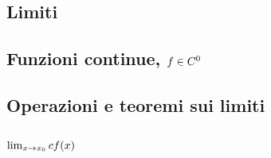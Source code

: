 \documentclass[letterpaper,10pt,italian]{jupyterBook}
\begin{document}
\subsection{Limiti}
\label{\detokenize{ch/infinitesimal_calculus/analysis-notes:limiti}}

\subsection{Funzioni continue, \protect\(f \in C^0\protect\)}
\label{\detokenize{ch/infinitesimal_calculus/analysis-notes:funzioni-continue-f-in-c-0}}

\subsection{Operazioni e teoremi sui limiti}
\label{\detokenize{ch/infinitesimal_calculus/analysis-notes:operazioni-e-teoremi-sui-limiti}}\label{\detokenize{ch/infinitesimal_calculus/analysis-notes:infinitesimal-calculus-limits-thms-notes}}\subsubsection*{\protect\(\lim_{x \rightarrow x_0} c f(x)\protect\)}
\end{document}
